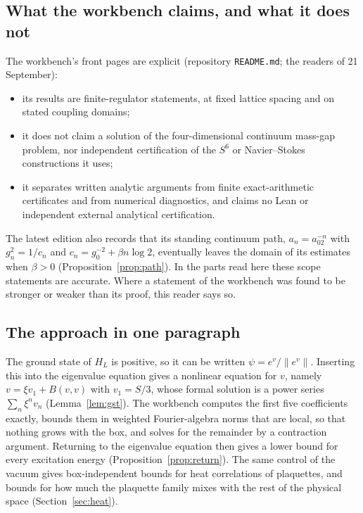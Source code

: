 \subsection{What the workbench claims, and what it does not}

The workbench's front pages are explicit (repository \texttt{README.md}; the readers of 21 September):
\begin{itemize}
\item its results are finite-regulator statements, at fixed lattice spacing and on stated coupling domains;
\item it does not claim a solution of the four-dimensional continuum mass-gap problem, nor independent certification of the $S^6$ or Navier--Stokes constructions it uses;
\item it separates written analytic arguments from finite exact-arithmetic certificates and from numerical diagnostics, and claims no Lean or independent external analytical certification.
\end{itemize}
The latest edition also records that its standing continuum path, $a_n=a_02^{-n}$ with $g_n^2=1/c_n$ and $c_n=g_0^{-2}+\beta n\log2$, eventually leaves the domain of its estimates when $\beta>0$ (Proposition~\ref{prop:path}). In the parts read here these scope statements are accurate. Where a statement of the workbench was found to be stronger or weaker than its proof, this reader says so.

\subsection{The approach in one paragraph}

The ground state of $H_L$ is positive, so it can be written $\psi=e^v/\|e^v\|$. Inserting this into the eigenvalue equation gives a nonlinear equation for $v$, namely $v=\xi v_1+B(v,v)$ with $v_1=S/3$, whose formal solution is a power series $\sum_n\xi^nv_n$ (Lemma~\ref{lem:gst}). The workbench computes the first five coefficients exactly, bounds them in weighted Fourier-algebra norms that are local, so that nothing grows with the box, and solves for the remainder by a contraction argument. Returning to the eigenvalue equation then gives a lower bound for every excitation energy (Proposition~\ref{prop:return}). The same control of the vacuum gives box-independent bounds for heat correlations of plaquettes, and bounds for how much the plaquette family mixes with the rest of the physical space (Section~\ref{sec:heat}).
